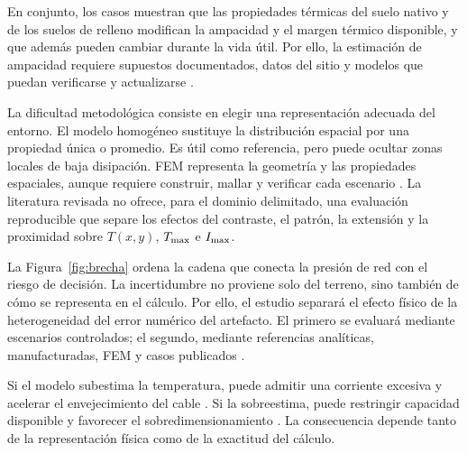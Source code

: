 En conjunto, los casos muestran que las propiedades térmicas del suelo nativo y de los suelos de relleno modifican la ampacidad y el margen térmico disponible, y que además pueden cambiar durante la vida útil. Por ello, la estimación de ampacidad requiere supuestos documentados, datos del sitio y modelos que puedan verificarse y actualizarse \parencites{fariz2026}{mobius2025}.

La dificultad metodológica consiste en elegir una representación adecuada del entorno. El modelo homogéneo sustituye la distribución espacial por una propiedad única o promedio. Es útil como referencia, pero puede ocultar zonas locales de baja disipación. FEM representa la geometría y las propiedades espaciales, aunque requiere construir, mallar y verificar cada escenario \parencites[3--4,93--99]{cigre2025}[1--3]{aldulaimi2024}. La literatura revisada no ofrece, para el dominio delimitado, una evaluación reproducible que separe los efectos del contraste, el patrón, la extensión y la proximidad sobre $T(x,y)$, $T_{\max}$ e $I_{\max}$.

La Figura~\ref{fig:brecha} ordena la cadena que conecta la presión de red con el riesgo de decisión. La incertidumbre no proviene solo del terreno, sino también de cómo se representa en el cálculo. Por ello, el estudio separará el efecto físico de la heterogeneidad del error numérico del artefacto. El primero se evaluará mediante escenarios controlados; el segundo, mediante referencias analíticas, manufacturadas, FEM y casos publicados \parencites[4--6]{enescu2021}[3--4,93--99]{cigre2025}.

Si el modelo subestima la temperatura, puede admitir una corriente excesiva y acelerar el envejecimiento del cable \parencite[1--2,9]{khumalo2025}. Si la sobreestima, puede restringir capacidad disponible y favorecer el sobredimensionamiento \parencites[4--6]{enescu2021}[1--2,9]{khumalo2025}. La consecuencia depende tanto de la representación física como de la exactitud del cálculo.

\vspace{0.15cm}

